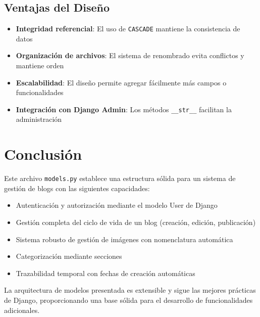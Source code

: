 \documentclass[12pt,a4paper]{article}
\begin{document}
	\subsection{Ventajas del Diseño}
	\begin{itemize}
		\item \textbf{Integridad referencial}: El uso de \texttt{CASCADE} mantiene la consistencia de datos
		\item \textbf{Organización de archivos}: El sistema de renombrado evita conflictos y mantiene orden
		\item \textbf{Escalabilidad}: El diseño permite agregar fácilmente más campos o funcionalidades
		\item \textbf{Integración con Django Admin}: Los métodos \texttt{\_\_str\_\_} facilitan la administración
	\end{itemize}
	
	\section{Conclusión}
	
	Este archivo \texttt{models.py} establece una estructura sólida para un sistema de gestión de blogs con las siguientes capacidades:
	
	\begin{itemize}
		\item Autenticación y autorización mediante el modelo User de Django
		\item Gestión completa del ciclo de vida de un blog (creación, edición, publicación)
		\item Sistema robusto de gestión de imágenes con nomenclatura automática
		\item Categorización mediante secciones
		\item Trazabilidad temporal con fechas de creación automáticas
	\end{itemize}
	
	La arquitectura de modelos presentada es extensible y sigue las mejores prácticas de Django, proporcionando una base sólida para el desarrollo de funcionalidades adicionales.
	
\end{document}
